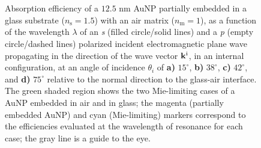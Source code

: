\begin{figure}[t!]\footnotesize \centering
	\vspace*{3.5em}
    \hspace*{-.65\textwidth}%
        \begin{subfigure}{.735\textwidth}\caption{ }\label{sfig:Inc:Abs:15}\end{subfigure}%
        \begin{subfigure}{.25\textwidth}\caption{ }\label{sfig:Inc:Abs:38}\end{subfigure} \\[19.5em]
    \hspace*{-.65\textwidth}%
        \begin{subfigure}{.735\textwidth}\caption{ }\label{sfig:Inc:Abs:42}\end{subfigure}%
        \begin{subfigure}{.25\textwidth}\caption{ }\label{sfig:Inc:Abs:75}\end{subfigure} \\[-28em]
    \def\svgwidth{.95\textwidth}
    \vspace*{1.25em}
    \caption[Absorption Efficiency of a partially embedded 12.5 nm AuNP into a substrate Illuminated in an internal configuration at oblique incidence]{%
    Absorption efficiency of a $12.5$ nm AuNP partially embedded in a glass substrate ($n_\text{s} = 1.5$) with an air matrix ($n_\text{m} = 1$), as a function of the wavelength $\lambda$ of an \textit{s} (filled circle/solid lines) and a \textit{p} (empty circle/dashed lines) polarized incident electromagnetic plane wave propagating in the direction of the wave vector $\vb{k}^\text{i}$, in an internal configuration, at an angle of incidence $\theta_i$ of \textbf{a)} $15^\circ$, \textbf{b)} $38^\circ$, \textbf{c)} $42^\circ$, and \textbf{d)} $75^\circ$  relative to the normal direction to the glass-air interface. The green shaded region shows the two Mie-limiting cases of a AuNP embedded in air
and in glass; the magenta (partially embedded AuNP) and cyan (Mie-limiting) markers correspond to the efficiencies evaluated at the wavelength of resonance for each case; the gray  line is a guide  to the eye.
}
\label{fig:Inc:Abs}
\end{figure}

